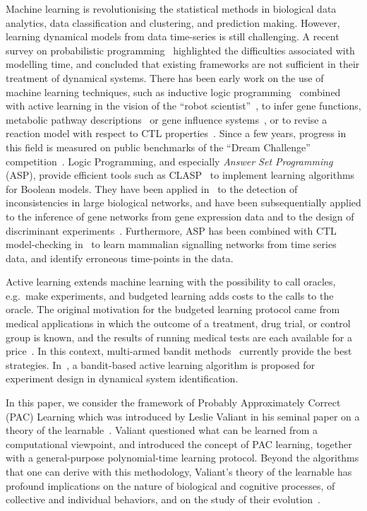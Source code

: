 \documentclass{llncs}
\begin{document}
Machine learning is revolutionising the statistical methods in biological data analytics,
data classification and clustering, and prediction making.
However, learning dynamical models from data time-series is still challenging.
A recent survey on probabilistic programming~\cite{GHNR14fose}
highlighted the difficulties associated with modelling time,
and concluded that existing frameworks are not sufficient in their treatment of dynamical systems.
There has been early work on the use of machine learning techniques, such as inductive
 logic programming~\cite{Muggleton95ngc} combined with active learning in the vision of the ``robot scientist''~\cite{BMOKRK01etai},
to infer gene functions,
metabolic pathway descriptions~\cite{AM02etai,AM02slps}
or gene influence systems~\cite{BCRG04jtb},
or to revise a reaction model with respect to CTL properties~\cite{CCFS06tcsb}.
Since a few years, progress in this field is measured on public benchmarks
of the ``Dream Challenge'' competition~\cite{Meyer14bmc}.
Logic Programming, and especially \emph{Answer Set Programming} (ASP), provide efficient tools such as CLASP~\cite{GKNS07lpnmr}
to implement learning algorithms for Boolean models.
They have been applied in~\cite{GSTUV08iclp} to the detection of  inconsistencies in large biological networks,
and have been subsequentially applied to the inference of gene networks from gene expression data and to the design of discriminant experiments~\cite{VKASSSG15frontiers}.
Furthermore, ASP has been combined with CTL model-checking in~\cite{OPSSG16biosystems} to learn mammalian signalling networks from time series data,
and identify erroneous time-points in the data.

Active learning extends machine learning with the possibility to call oracles, e.g.~make experiments,
and budgeted learning adds costs to the calls to the oracle.
The original motivation for the budgeted learning protocol came from medical applications in which the outcome of a treatment,
drug trial, or control group is known, and the results of running medical tests are each available for a price~\cite{DZBSM13ml}.
In this context, multi-armed bandit methods~\cite{DBSSZ07icdm} currently provide the best strategies.
In~\cite{LMALS14ecml}, a bandit-based active learning algorithm is proposed for experiment design in dynamical system identification.

In this paper, we consider the framework of Probably Approximately Correct (PAC) Learning 
which was introduced by Leslie Valiant in his seminal paper on a theory of the learnable~\cite{Valiant84cacm}.
Valiant questioned what can be learned from a computational viewpoint,
and introduced the concept of PAC learning,
together with a general-purpose polynomial-time learning protocol.
Beyond the algorithms that one can derive with this methodology,
Valiant's theory of the learnable has profound implications
on the nature of biological and cognitive processes,
of collective and individual behaviors,
and on the study of their evolution~\cite{Valiant13book}.
\end{document}
